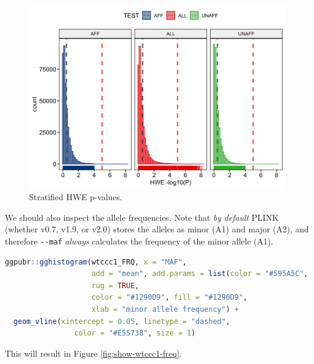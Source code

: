 \documentclass[
]{book}
\newcommand{\passthrough}[1]{#1}
\begin{document}
\begin{figure}

{\centering \includegraphics[width=18.67in]{img/WTCCC1 HWE} 

}

\caption{Stratified HWE p-values.}\label{fig:show-wtccc1-hwe}
\end{figure}

We should also inspect the allele frequencies. Note that \emph{by default} PLINK (whether v0.7, v1.9, or v2.0) stores the alleles as minor (A1) and major (A2), and therefore \passthrough{\lstinline!--maf!} \emph{always} calculates the frequency of the minor allele (A1).

\begin{lstlisting}[language=R]
ggpubr::gghistogram(wtccc1_FRQ, x = "MAF",
                    add = "mean", add.params = list(color = "#595A5C", linetype = "dashed", size = 1),
                    rug = TRUE,
                    color = "#1290D9", fill = "#1290D9",
                    xlab = "minor allele frequency") +
  geom_vline(xintercept = 0.05, linetype = "dashed",
                color = "#E55738", size = 1)
\end{lstlisting}

This will result in Figure \ref{fig:show-wtccc1-freq}.
\end{document}
